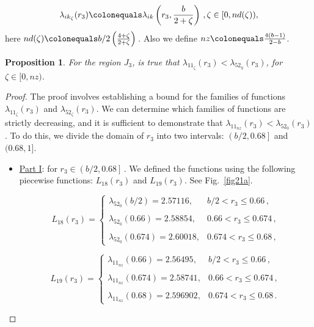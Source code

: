 \documentclass[final,11pt]{article}
\numberwithin{equation}{section}
\newtheorem{proposition}[theorem]{Proposition}
\theoremstyle{definition}
\begin{document}
\begin{equation*}
\lambda_{ik_{\zeta}}(r_{3})\colonequals\lambda_{ik}\left(r_{3},\frac{b}{2+\zeta}\right)\,, \zeta\in [0,nd(\zeta)),
\end{equation*}
here $nd(\zeta)\colonequals b/2\left(\frac{4+\zeta}{2+\zeta}\right)$\,. Also we define $nz\colonequals\frac{4(b-1)}{2-b}$.

\begin{proposition}\label{proposicionJ3}
For the region $J_{3}$, is true that $\lambda_{11_{\zeta}}(r_{3})<\lambda_{52_{\eta}}(r_{3})$, for $\zeta\in[0,nz)$.
\end{proposition}

\begin{proof}
The proof involves establishing a bound for the families of functions \(\lambda_{11_{\zeta}}(r_{3})\) and \(\lambda_{52_{\zeta}}(r_{3})\). We can determine which families of functions are strictly decreasing, and it is sufficient to demonstrate that \(\lambda_{11_{nz}}(r_{3}) < \lambda_{52_{0}}(r_{3})\). To do this, we divide the domain of \(r_{3}\) into two intervals: \(\left(b/2, 0.68\right]\) and \((0.68, 1]\).

\begin{itemize}
\item \underline{Part I}: for $r_{3}\in\left(b/2,0.68\right]$\,. We defined the functions using the following piecewise functions: \( L_{18}(r_{3}) \) and \( L_{19}(r_{3}) \). See Fig.~\ref{fig21a}.

\begin{equation*}
L_{18}(r_3)= \left\{ \begin{array}{lll}
          \lambda_{52_{0}}\left(b/2\right)=2.57116,  &b/2< r_3 \leq 0.66\,, \\
             \\    \lambda_{52_{0}}\left(0.66\right)=2.58854, &0.66<r_3\leq0.674\,, \\
						 \\    \lambda_{52_{0}}\left(0.674\right)=2.60018, &0.674<r_3\leq 0.68\,, 
             \end{array}
   \right.
\end{equation*}

\begin{equation*}
L_{19}(r_3)= \left\{ \begin{array}{lll}
          \lambda_{11_{nz}}\left(0.66\right)=2.56495,  &b/2< r_3 \leq 0.66\,, \\
             \\    \lambda_{11_{nz}}\left(0.674\right)=2.58741, &0.66<r_3\leq 0.674\,, \\
						 \\    \lambda_{11_{nz}}\left(0.68\right)=2.596902, &0.674<r_3 \leq 0.68\,.
             \end{array}
   \right.
\end{equation*}


\end{itemize}
\end{proof}
\end{document}
